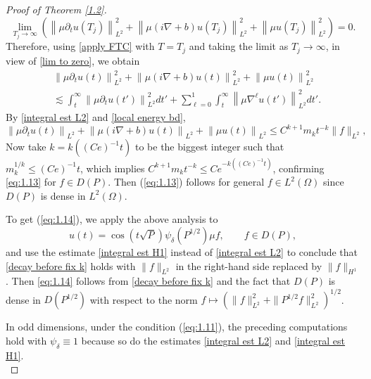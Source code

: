 \documentclass[11pt]{amsart}
\numberwithin{equation}{section}
\begin{document}
\begin{proof}[Proof of Theorem \ref{1.2}]
\begin{equation}\label{lim to zero}
\lim_{T_j\to\infty} \left(\left\|\mu \partial_tu(T_j)\right\|_{L^2}^2+\left\|\mu(i\nabla+b)u(T_j)\right\|_{L^2}^2
+\left\|\mu u(T_j)\right\|_{L^2}^2\right)=0.
\end{equation}
Therefore, using \eqref{apply FTC} with $T=T_j$ and taking the limit as $T_j\to\infty$, in view of \eqref{lim to zero}, we obtain
\begin{equation}\label{local energy bd}
\begin{split}
&\left\|\mu \partial_tu(t)\right\|_{L^2}^2+\left\|\mu(i\nabla+b)u(t)\right\|_{L^2}^2+\left\|\mu u(t)\right\|_{L^2}^2\\
&\lesssim\int_t^\infty\left\|\mu\partial_t u(t')\right\|_{L^2}^2dt'+\sum_{\ell=0}^1
\int_t^\infty\left\|\mu\nabla^{\ell}u(t')\right\|_{L^2}^2dt'.
\end{split}
\end{equation}
By \eqref{integral est L2} and \eqref{local energy bd},
\begin{equation} \label{decay before fix k}
\left\|\mu\partial_t u(t)\right\|_{L^2}+\left\|\mu(i\nabla+b)u(t)\right\|_{L^2}+\left\|\mu u(t)\right\|_{L^2}\le C^{k+1}m_kt^{-k}\|f\|_{L^2},
\end{equation}
Now take $k = k((Ce)^{-1}t)$ to be the biggest integer such that $m_k^{1/k} \le (Ce)^{-1}t$, which implies $C^{k+1} m_k t^{-k} \le Ce^{-k((Ce)^{-1}t)}$, confirming \eqref{eq:1.13} for $f \in D(P)$. Then (\ref{eq:1.13}) follows for general $f \in L^2(\Omega)$ since $D(P)$ is dense in $L^2(\Omega)$.

To get (\ref{eq:1.14}), we apply the above analysis
to
\begin{equation*}
u(t) = \cos(t \sqrt{P}) \psi_\delta(P^{1/2})\mu f,\qquad f \in D(P),
\end{equation*}
 and use the estimate \eqref{integral est H1} instead of \eqref{integral est L2} to conclude that  \eqref{decay before fix k} holds with $\|f\|_{L^2}$ in the right-hand side replaced by $\|f\|_{H^1}$. Then \eqref{eq:1.14} follows from \eqref{decay before fix k} and the fact that $D(P)$ is dense in $D(P^{1/2})$ with respect to the norm $f \mapsto (\|f\|^2_{L^2} + \|P^{1/2} f\|^2_{L^2})^{1/2}$. 


In odd dimensions, under the condition (\ref{eq:1.11}),
the preceding computations hold with $\psi_\delta \equiv 1$ because so do the estimates \eqref{integral est L2} and \eqref{integral est H1}. \\
\end{proof}
\end{document}
